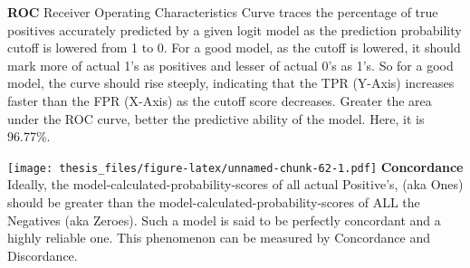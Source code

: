 \documentclass[12pt,twoside]{reedthesis}
\newenvironment{Shaded}{\begin{snugshade}}{\end{snugshade}}
\newcommand{\KeywordTok}[1]{\textcolor[rgb]{0.13,0.29,0.53}{\textbf{{#1}}}}
\newcommand{\NormalTok}[1]{{#1}}
\theoremstyle{definition}
\theoremstyle{definition}
\theoremstyle{definition}
\theoremstyle{remark}
\begin{document}
\hfill\break
\textbf{ROC} \hfill\break
Receiver Operating Characteristics Curve traces the percentage of true
positives accurately predicted by a given logit model as the prediction
probability cutoff is lowered from 1 to 0. For a good model, as the
cutoff is lowered, it should mark more of actual 1's as positives and
lesser of actual 0's as 1's. So for a good model, the curve should rise
steeply, indicating that the TPR (Y-Axis) increases faster than the FPR
(X-Axis) as the cutoff score decreases. Greater the area under the ROC
curve, better the predictive ability of the model. Here, it is 96.77\%.
\begin{Shaded}
\end{Shaded}
\texttt{[image: thesis\_files/figure-latex/unnamed-chunk-62-1.pdf]}
\hfill\break
\textbf{Concordance} \hfill\break
Ideally, the model-calculated-probability-scores of all actual
Positive's, (aka Ones) should be greater than the
model-calculated-probability-scores of ALL the Negatives (aka Zeroes).
Such a model is said to be perfectly concordant and a highly reliable
one. This phenomenon can be measured by Concordance and Discordance.
\end{document}
